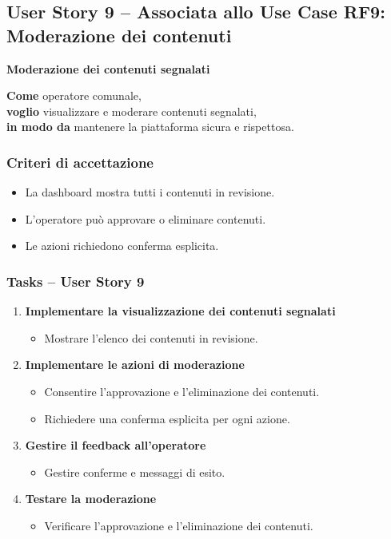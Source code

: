 \documentclass{article}
\begin{document}

\subsection{User Story 9 -- Associata allo Use Case RF9: Moderazione dei contenuti}

\textbf{Moderazione dei contenuti segnalati}

\textbf{Come} operatore comunale,\\
\textbf{voglio} visualizzare e moderare contenuti segnalati,\\
\textbf{in modo da} mantenere la piattaforma sicura e rispettosa.

\subsubsection{Criteri di accettazione}
\begin{itemize}
    \item La dashboard mostra tutti i contenuti in revisione.
    \item L’operatore può approvare o eliminare contenuti.
    \item Le azioni richiedono conferma esplicita.
\end{itemize}

\subsubsection{Tasks -- User Story 9}
\begin{enumerate}
    \item \textbf{Implementare la visualizzazione dei contenuti segnalati}
    \begin{itemize}
        \item Mostrare l'elenco dei contenuti in revisione.
    \end{itemize}

    \item \textbf{Implementare le azioni di moderazione}
    \begin{itemize}
        \item Consentire l'approvazione e l'eliminazione dei contenuti.
        \item Richiedere una conferma esplicita per ogni azione.
    \end{itemize}

    \item \textbf{Gestire il feedback all'operatore}
    \begin{itemize}
        \item Gestire conferme e messaggi di esito.
    \end{itemize}

    \item \textbf{Testare la moderazione}
    \begin{itemize}
        \item Verificare l'approvazione e l'eliminazione dei contenuti.
    \end{itemize}
\end{enumerate}
\end{document}
